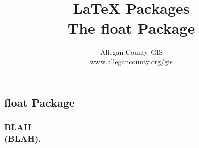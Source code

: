 \documentclass[class=report , crop=false, multi={itemize, figure}, float=false]{standalone}
\title{ %
\HRule %
\\[.4cm] %
	\Huge \bfseries \LaTeX{} Packages\\ \medskip\large The float Package %
\HRule \\[.4cm] %
}  %
\author{\Large Allegan County GIS \\\Large www.allegancounty.org/gis} %
\begin{document}

\ifstandalone
\maketitle %
\tableofcontents %
\clearpage
\fi

\subsection{float Package}
	\medskip 
	\subsubsection{\Large BLAH \\\small(BLAH).}

	
\end{document}
